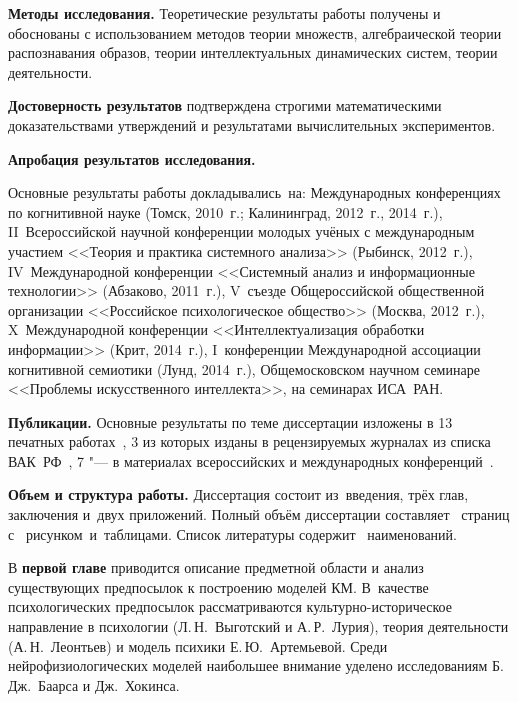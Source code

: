 \textbf{Методы исследования.} Теоретические результаты работы получены и обоснованы с использованием методов теории множеств, алгебраической теории распознавания образов, теории интеллектуальных динамических систем, теории деятельности.

\textbf{Достоверность результатов} подтверждена строгими математическими доказательствами утверждений и результатами вычислительных экспериментов.

\textbf{Апробация результатов исследования.}

Основные результаты работы докладывались~на: Международных конференциях по когнитивной науке (Томск, 2010~г.; Калининград, 2012~г., 2014~г.), II~Всероссийской научной конференции молодых учёных с международным участием <<Теория и практика системного анализа>> (Рыбинск, 2012~г.), IV~Международной конференции <<Системный анализ и информационные технологии>> (Абзаково, 2011~г.), V~съезде Общероссийской общественной организации <<Российское психологическое общество>> (Москва, 2012~г.), X~Международной конференции <<Интеллектуализация обработки информации>> (Крит, 2014~г.), I~конференции Международной ассоциации когнитивной семиотики (Лунд, 2014~г.), Общемосковском научном семинаре <<Проблемы искусственного интеллекта>>, на семинарах ИСА~РАН.

\textbf{Публикации.} Основные результаты по теме диссертации изложены в 13 печатных работах~\cite{PanovA2011,PanovA2012a,PanovA2012b,PanovA2012c,PanovA2013b,PanovA2014a,PanovT2010b,PanovT2012a,PanovT2012b,PanovT2013,PanovT2014a,PanovT2014b,PanovA2014c,PanovAE2014a}, 3 из которых изданы в рецензируемых журналах из списка ВАК~РФ~\cite{PanovA2012c,PanovA2013b,PanovA2014a}, 7 "--- в материалах всероссийских и международных конференций~\cite{PanovA2011,PanovA2012a,PanovA2012b,PanovT2010b,PanovT2012b,PanovT2014a,PanovT2014b}.

\textbf{Объем и структура работы.} Диссертация состоит из~введения, трёх глав, заключения и~двух приложений. Полный объём диссертации составляет \totalpages\ страниц с \totalfigures\ рисунком\iftotaltables\ и\totaltables\ таблицами\fi. Список литературы содержит \totalcitnums\ наименований.

В \textbf{первой главе} приводится описание предметной области и анализ существующих предпосылок к построению моделей КМ. В~качестве психологических предпосылок рассматриваются культурно-историческое направление в психологии (Л.\,Н.~Выготский и А.\,Р.~Лурия), теория деятельности (А.\,Н.~Леонтьев) и модель психики Е.\,Ю.~Артемьевой. Среди нейрофизиологических моделей наибольшее внимание уделено исследованиям Б.\,Дж.~Баарса и Дж.~Хокинса.

